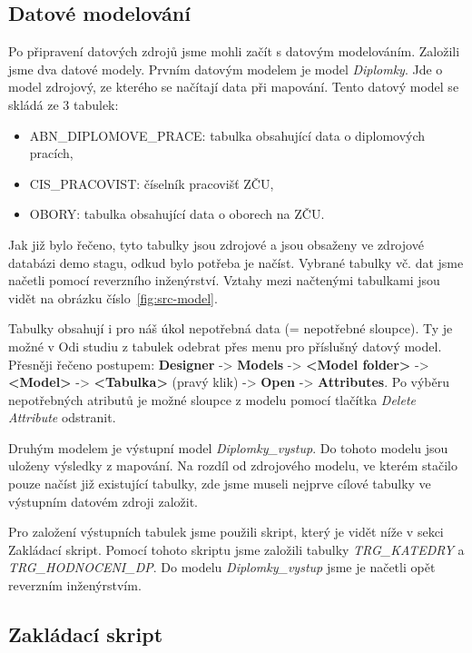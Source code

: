 \subsection{Datové modelování}

Po připravení datových zdrojů jsme mohli začít s datovým modelováním.
Založili jsme dva datové modely.
Prvním datovým modelem je model \textit{Diplomky}.
Jde o model zdrojový, ze kterého se načítají data při mapování.
Tento datový model se skládá ze 3 tabulek: 

\begin{itemize}
    \item ABN\_DIPLOMOVE\_PRACE: tabulka obsahující data o diplomových pracích,
    \item CIS\_PRACOVIST: číselník pracovišť ZČU,
    \item OBORY: tabulka obsahující data o oborech na ZČU.
\end{itemize}

Jak již bylo řečeno, tyto tabulky jsou zdrojové a jsou obsaženy ve zdrojové databázi demo stagu, odkud bylo potřeba je načíst.
Vybrané tabulky vč. dat jsme načetli pomocí reverzního inženýrství.
Vztahy mezi načtenými tabulkami jsou vidět na obrázku číslo~\ref{fig:src-model}.

Tabulky obsahují i pro náš úkol nepotřebná data (= nepotřebné sloupce).
Ty je možné v Odi studiu z tabulek odebrat přes menu pro příslušný datový model.
Přesněji řečeno postupem: \textbf{Designer} -> \textbf{Models} -> \textbf{<Model folder>} -> \textbf{<Model>} -> \textbf{<Tabulka>} (pravý klik) -> \textbf{Open} -> \textbf{Attributes}.
Po výběru nepotřebných atributů je možné sloupce z modelu pomocí tlačítka \textit{Delete Attribute} odstranit. 

Druhým modelem je výstupní model \textit{Diplomky\_vystup}.
Do tohoto modelu jsou uloženy výsledky z mapování.
Na rozdíl od zdrojového modelu, ve kterém stačilo pouze načíst již existující tabulky, zde jsme museli nejprve cílové tabulky ve výstupním datovém zdroji založit.

Pro založení výstupních tabulek jsme použili skript, který je vidět níže v sekci Zakládací skript.
Pomocí tohoto skriptu jsme založili tabulky \textit{TRG\_KATEDRY} a \textit{TRG\_HODNOCENI\_DP}.
Do modelu \textit{Diplomky\_vystup} jsme je načetli opět reverzním inženýrstvím.  

\subsection{Zakládací skript}

